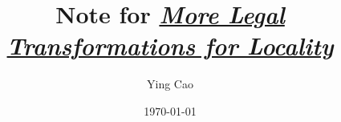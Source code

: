 \documentclass {article}
\title{Note for
\textit{\href{https://hal.inria.fr/inria-00001056/document}{More Legal Transformations for Locality}}}
\author{Ying Cao}
\date{\today}
\begin{document}
\maketitle
\tableofcontents



{
\small
\raggedright

\begin{spacing}{1}

\end{spacing}
}
\end{document}
